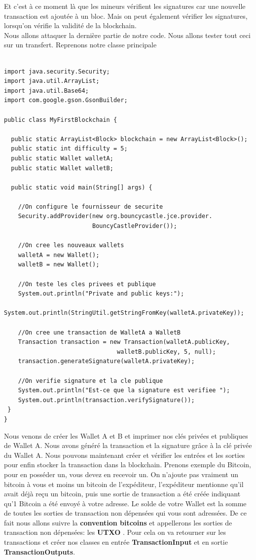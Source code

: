 \documentclass[12pt]{report}
\begin{document}
\hspace{1cm} Et c'est à ce moment là que les mineurs vérifient les signatures car une nouvelle transaction est ajoutée à un bloc. Mais on peut également vérifier les signatures, lorsqu'on vérifie la validité de la blockchain.\\
Nous allons attaquer la dernière partie de notre code. Nous allons tester tout ceci sur un transfert. Reprenons notre classe principale

\begin{lstlisting}

import java.security.Security;
import java.util.ArrayList;
import java.util.Base64;
import com.google.gson.GsonBuilder;

public class MyFirstBlockchain {
	
  public static ArrayList<Block> blockchain = new ArrayList<Block>();
  public static int difficulty = 5;
  public static Wallet walletA;
  public static Wallet walletB;

  public static void main(String[] args) {
  
    //On configure le fournisseur de securite
    Security.addProvider(new org.bouncycastle.jce.provider.
                         BouncyCastleProvider()); 
    
    //On cree les nouveaux wallets
    walletA = new Wallet();
    walletB = new Wallet();
    
    //On teste les cles privees et publique
    System.out.println("Private and public keys:");
    System.out.println(StringUtil.getStringFromKey(walletA.privateKey));
    
    //On cree une transaction de WalletA a WalletB
    Transaction transaction = new Transaction(walletA.publicKey, 
                                walletB.publicKey, 5, null);
    transaction.generateSignature(walletA.privateKey);
    
    //On verifie signature et la cle publique
    System.out.println("Est-ce que la signature est verifiee ");
    System.out.println(transaction.verifySignature());
 }
}

\end{lstlisting}

\hspace{1cm} Nous venons de créer les Wallet A et B et imprimer nos clés  privées et publiques de Wallet A. Nous avons généré la transaction et la signature grâce à la clé privée du Wallet A. Nous pouvons maintenant créer et vérifier les entrées et les sorties pour enfin stocker la transaction dans la blockchain. Prenons exemple du Bitcoin, pour en posséder un, vous devez en recevoir un. On n'ajoute pas vraiment un bitcoin à vous et moins un bitcoin de l'expéditeur, l'expéditeur mentionne qu'il avait déjà reçu un bitcoin, puis une sortie de transaction a été créée indiquant qu'1 Bitcoin a été envoyé à votre adresse. Le solde de votre Wallet est la somme de toutes les sorties de transaction non dépensées qui vous sont adressées. De ce fait nous allons suivre la \textbf{convention bitcoins} et appellerons les sorties de transaction non dépensées: les \textbf{UTXO} . Pour cela on va retourner sur les transactions et créer nos classes en entrée \textbf{TransactionInput} et en sortie \textbf{TransactionOutputs}. 
\end{document}
